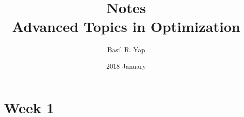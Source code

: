 \documentclass[a4paper, fleqn]{article}
\begin{document}
\title{Notes \\ Advanced Topics in Optimization}
\author{Basil R. Yap}
\date{2018 January}
\maketitle

\section{Week 1}
\end{document}
